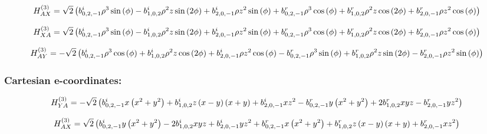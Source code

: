 \documentclass[fleqn]{article}
\begin{document}
\begin{dmath*}
H_{AX}^{(3)}=\sqrt{2} \left(b^{i}_{0,2,-1} \rho^{3} \sin{\left (\phi \right )} - b^{i}_{1,0,2} \rho^{2} z \sin{\left (2 \phi \right )} + b^{i}_{2,0,-1} \rho z^{2} \sin{\left (\phi \right )} + b^{r}_{0,2,-1} \rho^{3} \cos{\left (\phi \right )} + b^{r}_{1,0,2} \rho^{2} z \cos{\left (2 \phi \right )} + b^{r}_{2,0,-1} \rho z^{2} \cos{\left (\phi \right )}\right)\\
\end{dmath*}

\begin{dmath*}
H_{XA}^{(3)}=\sqrt{2} \left(b^{i}_{0,2,-1} \rho^{3} \sin{\left (\phi \right )} - b^{i}_{1,0,2} \rho^{2} z \sin{\left (2 \phi \right )} + b^{i}_{2,0,-1} \rho z^{2} \sin{\left (\phi \right )} + b^{r}_{0,2,-1} \rho^{3} \cos{\left (\phi \right )} + b^{r}_{1,0,2} \rho^{2} z \cos{\left (2 \phi \right )} + b^{r}_{2,0,-1} \rho z^{2} \cos{\left (\phi \right )}\right)\\
\end{dmath*}

\begin{dmath*}
H_{AY}^{(3)}=-  \sqrt{2} \left( b^{i}_{0,2,-1} \rho^{3} \cos{\left (\phi \right )} +  b^{i}_{1,0,2} \rho^{2} z \cos{\left (2 \phi \right )} +  b^{i}_{2,0,-1} \rho z^{2} \cos{\left (\phi \right )} -  b^{r}_{0,2,-1} \rho^{3} \sin{\left (\phi \right )} +  b^{r}_{1,0,2} \rho^{2} z \sin{\left (2 \phi \right )} -  b^{r}_{2,0,-1} \rho z^{2} \sin{\left (\phi \right )}\right)\\
\end{dmath*}
\subsubsection*{Cartesian e-coordinates:}

\begin{dmath*}
H_{YA}^{(3)}=-  \sqrt{2} \left( b^{i}_{0,2,-1} x \left(x^{2} + y^{2}\right) +  b^{i}_{1,0,2} z \left(x - y\right) \left(x + y\right) +  b^{i}_{2,0,-1} x z^{2} -  b^{r}_{0,2,-1} y \left(x^{2} + y^{2}\right) + 2 b^{r}_{1,0,2} x y z -  b^{r}_{2,0,-1} y z^{2}\right)\\
\end{dmath*}

\begin{dmath*}
H_{AX}^{(3)}=\sqrt{2} \left(b^{i}_{0,2,-1} y \left(x^{2} + y^{2}\right) - 2 b^{i}_{1,0,2} x y z + b^{i}_{2,0,-1} y z^{2} + b^{r}_{0,2,-1} x \left(x^{2} + y^{2}\right) + b^{r}_{1,0,2} z \left(x - y\right) \left(x + y\right) + b^{r}_{2,0,-1} x z^{2}\right)\\
\end{dmath*}
\end{document}
